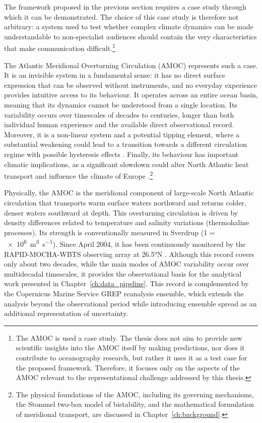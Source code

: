 The framework proposed in the previous section requires a case study through which it can be demonstrated. The choice of this case study is therefore not arbitrary: a system used to test whether complex climate dynamics can be made understandable to non-specialist audiences should contain the very characteristics that make communication difficult.\footnote{The AMOC is used a case study. The thesis does not aim to provide new scientific insights into the AMOC itself by making predictions, nor does it contribute to oceanography research, but rather it uses it as a test case for the proposed framework. Therefore, it focuses only on the aspects of the AMOC relevant to the representational challenge addressed by this thesis.}

The Atlantic Meridional Overturning Circulation (AMOC) represents such a case. It is an invisible system in a fundamental sense: it has no direct surface expression that can be observed without instruments, and no everyday experience provides intuitive access to its behaviour. It operates across an entire ocean basin, meaning that its dynamics cannot be understood from a single location. Its variability occurs over timescales of decades to centuries, longer than both individual human experience and the available direct observational record. Moreover, it is a non-linear system and a potential tipping element, where a substantial weakening could lead to a transition towards a different circulation regime with possible hysteresis effects \citep{lenton2008, armstrongmckay2022}. Finally, its behaviour has important climatic implications, as a significant slowdown could alter North Atlantic heat transport and influence the climate of Europe \citep{buckley2016}.\footnote{The physical foundations of the AMOC, including its governing mechanisms, the Stommel two-box model of bistability, and the mathematical formulation of meridional transport, are discussed in Chapter~\ref{ch:background}.}

Physically, the AMOC is the meridional component of large-scale North Atlantic circulation that transports warm surface waters northward and returns colder, denser waters southward at depth. This overturning circulation is driven by density differences related to temperature and salinity variations (thermohaline processes). Its strength is conventionally measured in Sverdrup (\SI{1}{\sverdrup} = \SI{e6}{\cubic\metre\per\second}). Since April 2004, it has been continuously monitored by the RAPID-MOCHA-WBTS observing array at \ang{26.5}N \citep{frajkawilliams2021, moat2026}. Although this record covers only about two decades, while the main modes of AMOC variability occur over multidecadal timescales, it provides the observational basis for the analytical work presented in Chapter~\ref{ch:data_pipeline}. This record is complemented by the Copernicus Marine Service GREP reanalysis ensemble, which extends the analysis beyond the observational period while introducing ensemble spread as an additional representation of uncertainty.

